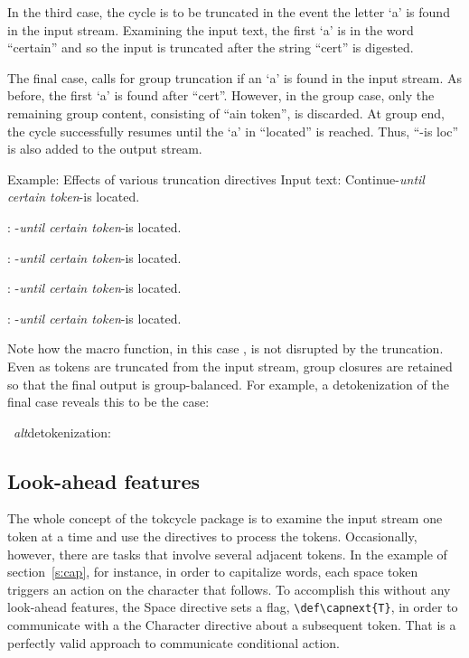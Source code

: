 \documentclass[10pt]{article}
\def\altdecytoks{\par\medskip\begingroup\noindent\macname{cytoks}
  \ \textit{alt}detokenization:\\\raggedright\footnotesize\ttfamily
  \expandafter\altdetokenize\expandafter{\the\cytoks}\normalsize\par
  \endgroup\medskip}
\newcommand\TokCycle{\textsf{tokcycle}}
\begin{document}
\medskip
In the third case, the cycle is to be truncated in the event the
  letter `a' is found in the input stream.
Examining the input text, the first `a' is in the word ``certain'' and
  so the input is truncated after the string ``cert'' is digested.

\medskip
The final case, calls for group truncation if an `a' is found in the
  input stream.
As before, the first `a' is found after ``cert''.
However, in the group case, only the remaining group content, consisting
  of ``ain token'', is discarded.
At group end, the cycle successfully resumes until the `a' in
  ``located'' is reached.
Thus, ``-is loc'' is also added to the output stream.

\def\thetext{Continue-\textit{until certain token}-is located.}

\newcommand\rundemowith[1]{%
  {\footnotesize\ttfamily\altdetokenize{#1}}: 
  \resettokcycle#1\expandafter\tokencyclexpress\thetext\endtokencyclexpress
}

\begin{exampleB}[text only, righthand width=0.01cm,  colback=white]%
{Example: Effects of various truncation directives}
{\footnotesize\ttfamily Input text}: \expandafter\altdetokenize\expandafter
 {\thetext}

\rundemowith{\Spacedirective{\truncatecycle}}

\rundemowith{\Spacedirective{\truncategroup}}

\rundemowith{\Characterdirective{\truncatecycleiftokis{a}{\addcytoks{#1}}}}

\rundemowith{\Characterdirective{\truncategroupiftokis{a}{\addcytoks{#1}}}}
\end{exampleB}

Note how the macro function, in this case , is not
  disrupted by the truncation.
Even as tokens are truncated from the input stream, group closures
  are retained so that the final output is group-balanced.
For example, a detokenization of the final case reveals this to be
  the case:

\altdecytoks

\endgroup

\subsection{Look-ahead features}

The whole concept of the \TokCycle{} package is to examine the input stream
  one token at a time and use the directives to process the tokens.
Occasionally, however, there are tasks that involve several adjacent tokens.
In the example of section~\ref{s:cap}, for instance, in order to capitalize
  words, each space token triggers an action on the character that follows.
To accomplish this without any look-ahead features, the Space directive sets
  a flag, \verb|\def\capnext{T}|, in order to communicate with a the Character
  directive about a subsequent token.
That is a perfectly valid approach to communicate conditional action.
\end{document}
